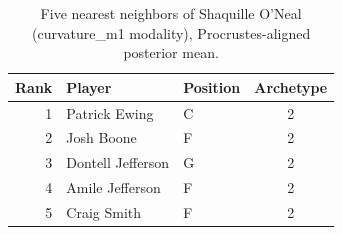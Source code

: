 \begin{table}[htbp]
  \centering\small
  \begin{tabular}{rllc}
    \toprule
    Rank & Player & Position & Archetype \\
    \midrule
    1 & Patrick Ewing & C & 2 \\
    2 & Josh Boone & F & 2 \\
    3 & Dontell Jefferson & G & 2 \\
    4 & Amile Jefferson & F & 2 \\
    5 & Craig Smith & F & 2 \\
    \bottomrule
  \end{tabular}
  \caption{Five nearest neighbors of Shaquille O'Neal (curvature_m1 modality), Procrustes-aligned posterior mean.}
  \label{tab:Shaquille_O_Neal_neighbors_curvature_m1}
\end{table}

